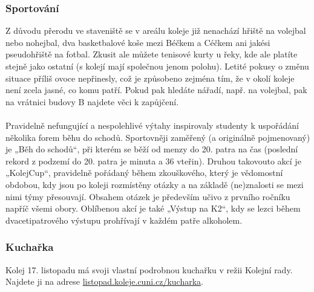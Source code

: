 \subsubsection{Sportování}
Z důvodu přerodu ve staveniště se v areálu koleje již nenachází hřiště na
volejbal nebo nohejbal, dva basketbalové koše mezi Béčkem a Céčkem ani jakési
pseudohřiště na fotbal. Zkusit ale můžete tenisové kurty u řeky, kde ale platíte
stejně jako ostatní (s kolejí mají společnou jenom polohu). Letité pokusy o
změnu situace příliš ovoce nepřinesly, což je způsobeno zejména tím, že v okolí
koleje není zcela jasné, co komu patří. Pokud pak hledáte nářadí, např. na
volejbal, pak na vrátnici budovy B najdete věci k zapůjčení.
\\\\
Pravidelně nefungující a nespolehlivé výtahy inspirovaly studenty k uspořádání
několika forem běhu do schodů. Sportovněji zaměřený (a originálně pojmenovaný)
je „Běh do schodů“, při kterém se běží od menzy do 20. patra na čas (poslední
rekord z podzemí do 20. patra je minuta a 36 vteřin). Druhou takovouto akcí je
„KolejCup“, pravidelně pořádaný během zkouškového, který je vědomostní obdobou,
kdy jsou po koleji rozmístěny otázky a na základě (ne)znalosti se mezi nimi týmy
přesouvají. Obsahem otázek je především učivo z prvního ročníku napříč všemi
obory. Oblíbenou akcí je také „Výstup na K2“, kdy se lezci během
dvacetipatrového výstupu prohřívají v každém patře alkoholem.


\subsubsection{Kuchařka}
Kolej 17. listopadu má svoji vlastní podrobnou kuchařku v režii Kolejní rady.
Najdete ji na adrese \url{listopad.koleje.cuni.cz/kucharka}.